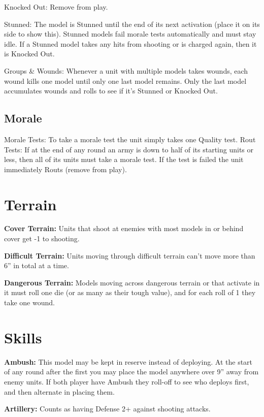 \documentclass[6pt]{scrreport}
\begin{document}
  Knocked Out: Remove from play.

  Stunned: The model is Stunned until the
  end of its next activation (place it on its
  side to show this). Stunned models fail
  morale tests automatically and must stay
  idle. If a Stunned model takes any hits
  from shooting or is charged again, then
  it is Knocked Out.

  Groups \& Wounds: Whenever a unit
  with multiple models takes wounds,
  each wound kills one model until only
  one last model remains. Only the last
  model accumulates wounds and rolls to
  see if it’s Stunned or Knocked Out.

  \section*{Morale}

  Morale Tests: To take a morale test the
  unit simply takes one Quality test.
  Rout Tests: If at the end of any round an
  army is down to half of its starting units
  or less, then all of its units must take a
  morale test. If the test is failed the unit
  immediately Routs (remove from play).

  \chapter*{Terrain}

  \textbf{Cover Terrain:} Units that shoot at
  enemies with most models in or behind
  cover get -1 to shooting.

  \textbf{Difficult Terrain:} Units moving through
  difficult terrain can’t move more than 6”
  in total at a time.

  \textbf{Dangerous Terrain:} Models moving
  across dangerous terrain or that activate
  in it must roll one die (or as many as
  their tough value), and for each roll of 1
  they take one wound.

\chapter*{Skills}

\textbf{Ambush:} This model may be kept in
reserve instead of deploying. At the start
of any round after the first you may
place the model anywhere over 9” away
from enemy units. If both player have
Ambush they roll-off to see who deploys
first, and then alternate in placing them.

\textbf{Artillery:} Counts as having Defense 2+
against shooting attacks.
\end{document}
